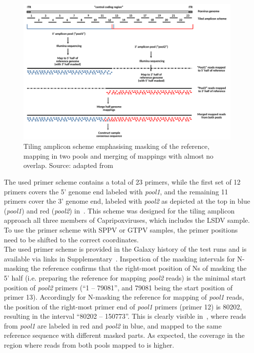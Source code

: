 \begin{figure}[ht!]
    \centering
    \hspace*{-8pt}
    \includegraphics[width=1.1\textwidth]{media/4-pox-ampl-fig.png}
    \caption[Tiling amplicon scheme used in poxvirus workflow.]{Tiling amplicon scheme emphasising masking of the reference, mapping in two pools and merging of mappings with almost no overlap. Source: adapted from }
    \label{fig:4-pox-ampl}
\end{figure}
The used primer scheme contains a total of 23 primers, while the first set of 12 primers covers the 5' genome end labeled with \textit{pool1}, and the remaining 11 primers cover the 3' genome end, labeled with \textit{pool2} as depicted at the top in blue (\textit{pool1}) and red (\textit{pool2}) in~. This scheme was designed for the tiling amplicon approach all three members of Capripoxviruses, which includes the \ac{LSDV} sample. To use the primer scheme with \ac{SPPV} or \ac{GTPV} samples, the primer positions need to be shifted to the correct coordinates.\\
The used primer scheme is provided in the Galaxy history of the test runs and is available via links in Supplementary~. Inspection of the masking intervals for N-masking the reference confirms that the right-most position of Ns of masking the 5' half (i.e. preparing the reference for mapping \textit{pool2} reads) is the minimal start position of \textit{pool2} primers (``1 -- 79081'', and 79081 being the start position of primer 13). Accordingly for N-masking the reference for mapping of \textit{pool1} reads, the position of the right-most primer end of \textit{pool1} primers (primer 12) is 80202, resulting in the interval ``80202 -- 150773''. This is clearly visible in~, where reads from \textit{pool1} are labeled in red and \textit{pool2} in blue, and mapped to the same reference sequence with different masked parts. As expected, the coverage in the region where reads from both pools mapped to is higher.\\
